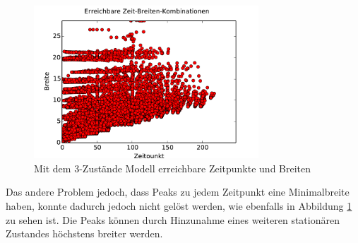 \begin{figure}[h]
\centering
\includegraphics[width=0.75\textwidth]{bilder/3a_zeitbreiten_ohnep}
\caption{Mit dem 3-Zustände Modell erreichbare Zeitpunkte und Breiten}
\label{Grenzen_3a_ohnep}
\end{figure}




Das andere Problem jedoch, dass Peaks zu jedem Zeitpunkt eine Minimalbreite haben, konnte dadurch jedoch nicht gelöst werden, wie ebenfalls in Abbildung \ref{Grenzen_3a_ohnep} zu sehen ist. Die Peaks können durch Hinzunahme eines weiteren stationären Zustandes höchstens breiter werden. 


% 

 
